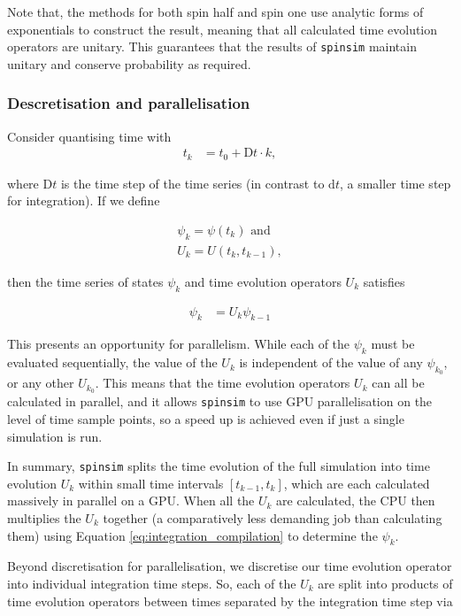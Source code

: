 \documentclass{jors}
\begin{document}
			Note that, the methods for both spin half and spin one use analytic forms of exponentials to construct the result, meaning that all calculated time evolution operators are unitary. This guarantees that the results of \texttt{spinsim} maintain unitary and conserve probability as required.

		\subsubsection{Descretisation and parallelisation}
			Consider quantising time with
			\begin{align}
				t_k &= t_0 + \mathrm{D}t\cdot k,
			\end{align}

			where \(\mathrm{D}t\) is the time step of the time series (in contrast to \(\mathrm{d}t\), a smaller time step for integration). If we define

			\begin{align}
				\psi_k = \psi(t_k)\textrm{ and}\\
				U_k = U(t_{k}, t_{k-1}),
			\end{align}
			
			then the time series of states \(\psi_k\) and time evolution operators \(U_k\) satisfies

			\begin{align}
				\psi_k &= U_k\psi_{k-1}\label{eq:integration_compilation}
			\end{align}

			This presents an opportunity for parallelism. While each of the \(\psi_k\) must be evaluated sequentially, the value of the \(U_k\) is independent of the value of any \(\psi_{k_0}\), or any other \(U_{k_0}\). This means that the time evolution operators \(U_k\) can all be calculated in parallel, and it allows \texttt{spinsim} to use GPU parallelisation on the level of time sample points, so a speed up is achieved even if just a single simulation is run.

			In summary, \texttt{spinsim} splits the time evolution of the full simulation into time evolution \(U_k\) within small time intervals \([t_{k - 1}, t_{k}]\), which are each calculated massively in parallel on a GPU. When all the \(U_k\) are calculated, the CPU then multiplies the \(U_k\) together (a comparatively less demanding job than calculating them) using Equation \eqref{eq:integration_compilation} to determine the \(\psi_k\).

			Beyond discretisation for parallelisation, we discretise our time evolution operator into individual integration time steps. So, each of the \(U_k\) are split into products of time evolution operators between times separated by the integration time step via
			
\end{document}
